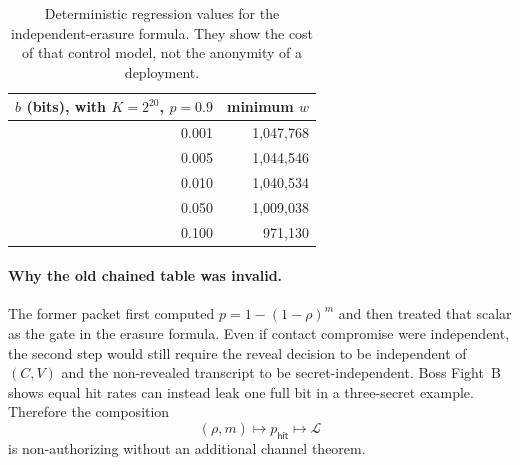 \documentclass[11pt]{article}
\newcommand{\MaxL}{\mathcal{L}}
\begin{document}
\begin{table}[H]
\centering
\small
\begin{tabular}{@{}r r@{}}
\toprule
\(b\) (bits), with \(K=2^{20}\), \(p=0.9\) & minimum \(w\)\\
\midrule
0.001 & 1,047,768\\
0.005 & 1,044,546\\
0.010 & 1,040,534\\
0.050 & 1,009,038\\
0.100 & 971,130\\
\bottomrule
\end{tabular}
\caption{Deterministic regression values for the independent-erasure formula. They show the cost of that control model, not the anonymity of a deployment.}
\label{tab:tiny-budget}
\end{table}

\paragraph{Why the old chained table was invalid.}
The former packet first computed \(p=1-(1-\rho)^m\) and then treated that scalar as the gate in the erasure formula. Even if contact compromise were independent, the second step would still require the reveal decision to be independent of \((C,V)\) and the non-revealed transcript to be secret-independent. Boss Fight~B shows equal hit rates can instead leak one full bit in a three-secret example. Therefore the composition
\[
(\rho,m)\longmapsto p_{\mathsf{hit}}\longmapsto \MaxL
\]
is non-authorizing without an additional channel theorem.
\end{document}
